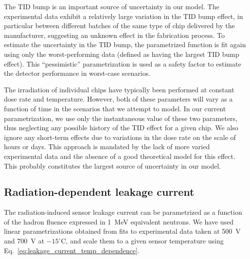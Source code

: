 The TID bump is an important source of uncertainty in our model. The experimental data exhibit
a relatively large variation in the TID bump effect, in particular
between different batches of the same type of chip delivered by the manufacturer, suggesting an unknown
effect in the fabrication process. To estimate the uncertainty in the TID bump,
the parametrized function is fit again using only the worst-performing data (defined as having the
largest TID bump effect). This ``pessimistic'' parametrization is used as a safety factor to estimate
the detector performance in worst-case scenarios.

The irradiation of individual chips have typically been performed at constant dose rate and temperature.
However, both of these parameters will vary as a function of time in the scenarios that we attempt to model.
In our current parametrization, we use only the instantaneous value of these two parameters, thus neglecting any possible history of the TID effect for a given chip. We also ignore any short-term effects due to variations in the dose rate on the scale of hours or days. This approach is mandated by the lack of more varied experimental data and the absence of a good theoretical model for this effect. This probably constitutes the largest source of uncertainty in our model.

\subsection{Radiation-dependent leakage current}

The radiation-induced sensor leakage current can be parametrized as a function of the hadron fluence expressed in 1~MeV equivalent neutrons.
We have used linear parametrizations obtained from fits to experimental data taken at 500~V and 700~V at $-15^\circ$C, and scale them to a given sensor temperature using Eq.~\ref{eq:leakage_current_temp_dependence}.

